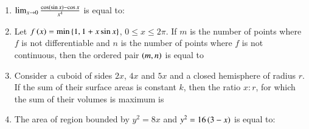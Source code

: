 \documentclass[journal,12pt,onecolumn]{IEEEtran}
\theoremstyle{remark}
\begin{document}
\begin{enumerate}
\item $\lim_{x\to 0}\frac{\cos\left(\sin x\right)-\cos x}{x^4}$ is equal to:

\hfill{}
\begin{enumerate}
\end{enumerate}

\item Let $f\left(x\right)=\min\left\{1,1+x\sin x\right\}$, $0\leq x\leq 2\pi$. If $m$ is the number of points where $f$ is not differentiable and $n$ is the number of points where $f$ is not continuous, then the ordered pair $\left(m,n\right)$ is equal to

\hfill{}
\begin{enumerate}
\end{enumerate}

\item Consider a cuboid of sides $2x$, $4x$ and $5x$ and a closed hemisphere of radius $r$. If the sum of their surface areas is constant $k$, then the ratio $x:r$, for which the sum of their volumes is maximum is 

\hfill{}
\begin{enumerate}
\end{enumerate}

\item The area of region bounded by $y^2=8x$ and $y^2=16\left(3-x\right)$ is equal to:

\hfill{}
\begin{enumerate}
\end{enumerate}


\end{enumerate}
\end{document}

